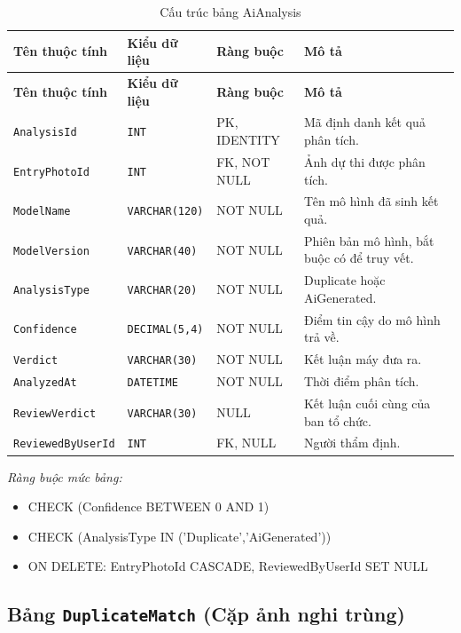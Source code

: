 \begin{longtable}{|L{4cm}|L{3.15cm}|L{2.4cm}|L{4.55cm}|}
\caption{Cấu trúc bảng AiAnalysis} \\
\hline
\textbf{Tên thuộc tính} & \textbf{Kiểu dữ liệu} & \textbf{Ràng buộc} & \textbf{Mô tả} \\ \hline
\endfirsthead
\hline
\textbf{Tên thuộc tính} & \textbf{Kiểu dữ liệu} & \textbf{Ràng buộc} & \textbf{Mô tả} \\ \hline
\endhead
\texttt{AnalysisId} & \texttt{INT} & PK, IDENTITY & Mã định danh kết quả phân tích. \\ \hline
\texttt{EntryPhotoId} & \texttt{INT} & FK, NOT NULL & Ảnh dự thi được phân tích. \\ \hline
\texttt{ModelName} & \texttt{VARCHAR(120)} & NOT NULL & Tên mô hình đã sinh kết quả. \\ \hline
\texttt{ModelVersion} & \texttt{VARCHAR(40)} & NOT NULL & Phiên bản mô hình, bắt buộc có để truy vết. \\ \hline
\texttt{AnalysisType} & \texttt{VARCHAR(20)} & NOT NULL & Duplicate hoặc AiGenerated. \\ \hline
\texttt{Confidence} & \texttt{DECIMAL(5,4)} & NOT NULL & Điểm tin cậy do mô hình trả về. \\ \hline
\texttt{Verdict} & \texttt{VARCHAR(30)} & NOT NULL & Kết luận máy đưa ra. \\ \hline
\texttt{AnalyzedAt} & \texttt{DATETIME} & NOT NULL & Thời điểm phân tích. \\ \hline
\texttt{ReviewVerdict} & \texttt{VARCHAR(30)} & NULL & Kết luận cuối cùng của ban tổ chức. \\ \hline
\texttt{ReviewedByUserId} & \texttt{INT} & FK, NULL & Người thẩm định. \\ \hline
\end{longtable}

\noindent\textit{Ràng buộc mức bảng:}

\begin{itemize}\raggedright
    \item CHECK (Confidence BETWEEN 0 AND 1)
    \item CHECK (AnalysisType IN ('Duplicate',\allowbreak{}'AiGenerated'))
    \item ON DELETE: EntryPhotoId CASCADE,\allowbreak{} ReviewedByUserId SET NULL
\end{itemize}

\subsection{Bảng \texttt{DuplicateMatch} (Cặp ảnh nghi trùng)}

